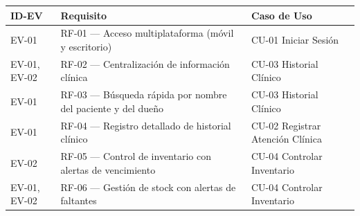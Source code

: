 \documentclass[
]{article}
\newcounter{none} %
\begin{document}
{\def\LTcaptype{none} %
\begin{longtable}[]{|
  >{\raggedright\arraybackslash}p{}|
  >{\raggedright\arraybackslash}p{}|
  >{\raggedright\arraybackslash}p{}|}
\hline
\begin{minipage}[b]{\linewidth}\raggedright
\textbf{ID-EV}
\end{minipage} & \begin{minipage}[b]{\linewidth}\raggedright
\textbf{Requisito}
\end{minipage} & \begin{minipage}[b]{\linewidth}\raggedright
\textbf{Caso de Uso}
\end{minipage} \\
\hline
\endhead
\hline
\endlastfoot
EV-01 & \begin{minipage}[t]{\linewidth}\raggedright
RF-01 --- Acceso multiplataforma (móvil y escritorio)
\end{minipage} & CU-01 Iniciar Sesión \\
\hline
EV-01, EV-02 & \begin{minipage}[t]{\linewidth}\raggedright
RF-02 --- Centralización de información clínica
\end{minipage} & CU-03 Historial Clínico \\
\hline
EV-01 & \begin{minipage}[t]{\linewidth}\raggedright
RF-03 --- Búsqueda rápida por nombre del paciente y del dueño
\end{minipage} & CU-03 Historial Clínico \\
\hline
EV-01 & \begin{minipage}[t]{\linewidth}\raggedright
RF-04 --- Registro detallado de historial clínico
\end{minipage} & CU-02 Registrar Atención Clínica \\
\hline
EV-02 & \begin{minipage}[t]{\linewidth}\raggedright
RF-05 --- Control de inventario con alertas de vencimiento
\end{minipage} & CU-04 Controlar Inventario \\
\hline
EV-01, EV-02 & \begin{minipage}[t]{\linewidth}\raggedright
RF-06 --- Gestión de stock con alertas de faltantes
\end{minipage} & CU-04 Controlar Inventario \\
\hline

\end{longtable}}
\end{document}
